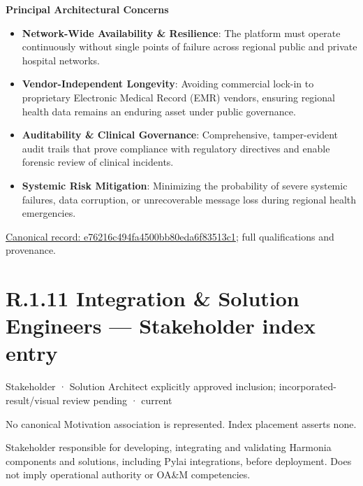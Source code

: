 \par\medskip\textbf{Principal Architectural Concerns}\par


\begin{itemize}


\item \textbf{Network-Wide Availability \& Resilience}: The platform must operate continuously without single points of failure across regional public and private hospital networks.

\item \textbf{Vendor-Independent Longevity}: Avoiding commercial lock-in to proprietary Electronic Medical Record (EMR) vendors, ensuring regional health data remains an enduring asset under public governance.

\item \textbf{Auditability \& Clinical Governance}: Comprehensive, tamper-evident audit trails that prove compliance with regulatory directives and enable forensic review of clinical incidents.

\item \textbf{Systemic Risk Mitigation}: Minimizing the probability of severe systemic failures, data corruption, or unrecoverable message loss during regional health emergencies.

\end{itemize}

{\footnotesize \href{../../../../../../../continuum/motivation/stakeholder/e76216c494fa4500bb80eda6f83513c1.md}{Canonical record: e76216c494fa4500bb80eda6f83513c1}; full qualifications and provenance.}\par
\section*{R.1.11 Integration \& Solution Engineers — Stakeholder index entry}
\label{navigation:R.1.11}

\label{element:1dc29678ec4a4a498620c84ffa03c2bb}
{\small Stakeholder · Solution Architect explicitly approved inclusion; incorporated-result/visual review pending · current}\par
No canonical Motivation association is represented. Index placement asserts none.\par

Stakeholder responsible for developing, integrating and validating Harmonia components and solutions, including Pylai integrations, before deployment. Does not imply operational authority or OA\&M competencies.


